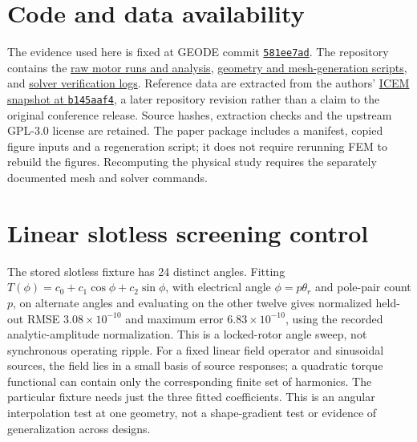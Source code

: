 \documentclass{anvil-paper}
\begin{document}
\section*{Code and data availability}
The evidence used here is fixed at GEODE commit
\href{https://github.com/rjwalters/geode-fem/tree/581ee7ad40c9646f43e0d6df3de7b5a87d06f798}{\texttt{581ee7ad}}.
The repository contains the
\href{https://github.com/rjwalters/geode-fem/tree/581ee7ad40c9646f43e0d6df3de7b5a87d06f798/benchmarks/motor_reference/forward}{raw motor runs and analysis},
\href{https://github.com/rjwalters/geode-fem/tree/581ee7ad40c9646f43e0d6df3de7b5a87d06f798/benchmarks/motor_reference/geometry}{geometry and mesh-generation scripts},
and \href{https://github.com/rjwalters/geode-fem/tree/581ee7ad40c9646f43e0d6df3de7b5a87d06f798/benchmarks/motor_nonlinear_m1}{solver verification logs}.
Reference data are extracted from the authors'
\href{https://github.com/MichaelWiesheu/ICEMsnapshot/tree/b145aaf4ab1a6424828bc941eaf172f48fa0d458}{ICEM snapshot at \texttt{b145aaf4}},
a later repository revision rather than a claim to the original conference
release. Source hashes, extraction checks and the upstream GPL-3.0 license
are retained. The paper package includes a manifest, copied figure inputs
and a regeneration script; it does not require rerunning FEM to rebuild
the figures. Recomputing the physical study requires the separately
documented mesh and solver commands.

\appendix
\section{Linear slotless screening control}\label{sec:slotless}
The stored slotless fixture has 24 distinct angles. Fitting
$T(\phi)=c_0+c_1\cos\phi+c_2\sin\phi$, with electrical angle $\phi=p\theta_r$ and pole-pair count $p$, on alternate angles and
evaluating on the other twelve gives normalized held-out RMSE
$3.08\times10^{-10}$ and maximum error $6.83\times10^{-10}$, using the
recorded analytic-amplitude normalization. This is a locked-rotor angle sweep,
not synchronous operating ripple. For a fixed linear field operator and
sinusoidal sources, the field lies in a small basis of source responses;
a quadratic torque functional can contain only the corresponding finite
set of harmonics. The particular fixture needs just the three fitted
coefficients. This is an angular interpolation test at one geometry,
not a shape-gradient test or evidence of generalization across designs.

\clearpage


\end{document}
